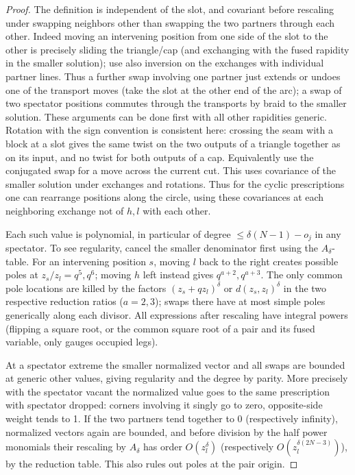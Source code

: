 \documentclass[11pt]{article}
\numberwithin{equation}{section}
\theoremstyle{definition}\newtheorem{definition}[theorem]{Definition}
\theoremstyle{remark}\newtheorem{remark}[theorem]{Remark}
\begin{document}
\begin{proof}
The definition is independent of the slot, and covariant before rescaling under swapping neighbors other than swapping the two partners through each other. Indeed moving an intervening position from one side of the slot to the other is precisely sliding the triangle/cap (and exchanging with the fused rapidity in the smaller solution); use also inversion on the exchanges with individual partner lines. Thus a further swap involving one partner just extends or undoes one of the transport moves (take the slot at the other end of the arc); a swap of two spectator positions commutes through the transports by braid to the smaller solution. These arguments can be done first with all other rapidities generic. Rotation with the sign convention is consistent here: crossing the seam with a block at a slot gives the same twist on the two outputs of a triangle together as on its input, and no twist for both outputs of a cap. Equivalently use the conjugated swap for a move across the current cut. This uses covariance of the smaller solution under exchanges and rotations. Thus for the cyclic prescriptions one can rearrange positions along the circle, using these covariances at each neighboring exchange not of \(h,l\) with each other.

Each such value is polynomial, in particular of degree \(\le\delta(N-1)-o_j\) in any spectator. To see regularity, cancel the smaller denominator first using the \(A_\delta\)-table. For an intervening position \(s\), moving \(l\) back to the right creates possible poles at \(z_s/z_l=q^5,q^6\); moving \(h\) left instead gives \(q^{a+2},q^{a+3}\). The only common pole locations are killed by the factors \((z_s+q z_l)^\delta\) or \(d(z_s,z_l)^\delta\) in the two respective reduction ratios (\(a=2,3\)); swaps there have at most simple poles generically along each divisor. All expressions after rescaling have integral powers (flipping a square root, or the common square root of a pair and its fused variable, only gauges occupied legs). 

At a spectator extreme the smaller normalized vector and all swaps are bounded at generic other values, giving regularity and the degree by parity. More precisely with the spectator vacant the normalized value goes to the same prescription with spectator dropped: corners involving it singly go to zero, opposite-side weight tends to 1. If the two partners tend together to 0 (respectively infinity), normalized vectors again are bounded, and before division by the half power monomials their rescaling by \(A_\delta\) has order \(O(z_l^\delta)\) (respectively \(O(z_l^{\delta(2N-3)})\)), by the reduction table. This also rules out poles at the pair origin.


\end{proof}
\end{document}

